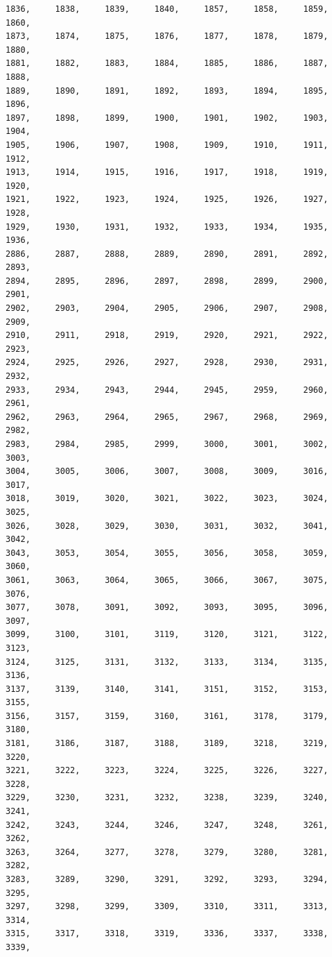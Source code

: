 \documentclass[a4paper,11pt]{report}
\begin{document}
\begin{verbatim}
1836,     1838,     1839,     1840,     1857,     1858,     1859,     1860,
1873,     1874,     1875,     1876,     1877,     1878,     1879,     1880,
1881,     1882,     1883,     1884,     1885,     1886,     1887,     1888,
1889,     1890,     1891,     1892,     1893,     1894,     1895,     1896,
1897,     1898,     1899,     1900,     1901,     1902,     1903,     1904,
1905,     1906,     1907,     1908,     1909,     1910,     1911,     1912,
1913,     1914,     1915,     1916,     1917,     1918,     1919,     1920,
1921,     1922,     1923,     1924,     1925,     1926,     1927,     1928,
1929,     1930,     1931,     1932,     1933,     1934,     1935,     1936,
2886,     2887,     2888,     2889,     2890,     2891,     2892,     2893,
2894,     2895,     2896,     2897,     2898,     2899,     2900,     2901,
2902,     2903,     2904,     2905,     2906,     2907,     2908,     2909,
2910,     2911,     2918,     2919,     2920,     2921,     2922,     2923,
2924,     2925,     2926,     2927,     2928,     2930,     2931,     2932,
2933,     2934,     2943,     2944,     2945,     2959,     2960,     2961,
2962,     2963,     2964,     2965,     2967,     2968,     2969,     2982,
2983,     2984,     2985,     2999,     3000,     3001,     3002,     3003,
3004,     3005,     3006,     3007,     3008,     3009,     3016,     3017,
3018,     3019,     3020,     3021,     3022,     3023,     3024,     3025,
3026,     3028,     3029,     3030,     3031,     3032,     3041,     3042,
3043,     3053,     3054,     3055,     3056,     3058,     3059,     3060,
3061,     3063,     3064,     3065,     3066,     3067,     3075,     3076,
3077,     3078,     3091,     3092,     3093,     3095,     3096,     3097,
3099,     3100,     3101,     3119,     3120,     3121,     3122,     3123,
3124,     3125,     3131,     3132,     3133,     3134,     3135,     3136,
3137,     3139,     3140,     3141,     3151,     3152,     3153,     3155,
3156,     3157,     3159,     3160,     3161,     3178,     3179,     3180,
3181,     3186,     3187,     3188,     3189,     3218,     3219,     3220,
3221,     3222,     3223,     3224,     3225,     3226,     3227,     3228,
3229,     3230,     3231,     3232,     3238,     3239,     3240,     3241,
3242,     3243,     3244,     3246,     3247,     3248,     3261,     3262,
3263,     3264,     3277,     3278,     3279,     3280,     3281,     3282,
3283,     3289,     3290,     3291,     3292,     3293,     3294,     3295,
3297,     3298,     3299,     3309,     3310,     3311,     3313,     3314,
3315,     3317,     3318,     3319,     3336,     3337,     3338,     3339,

\end{verbatim}
\end{document}
